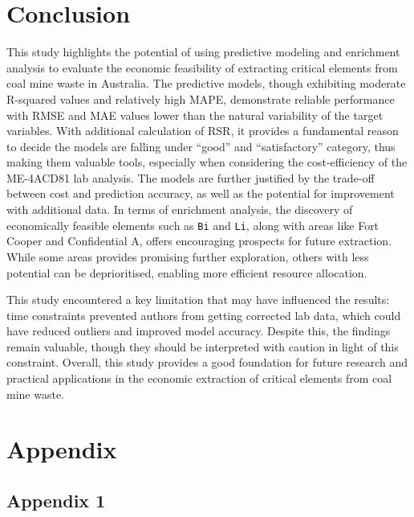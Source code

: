 \documentclass[11pt,a4paper,]{article}
\begin{document}
\section{Conclusion}\label{conclusion}

This study highlights the potential of using predictive modeling and enrichment analysis to evaluate the economic feasibility of extracting critical elements from coal mine waste in Australia. The predictive models, though exhibiting moderate R-squared values and relatively high MAPE, demonstrate reliable performance with RMSE and MAE values lower than the natural variability of the target variables. With additional calculation of RSR, it provides a fundamental reason to decide the models are falling under ``good'' and ``satisfactory'' category, thus making them valuable tools, especially when considering the cost-efficiency of the ME-4ACD81 lab analysis. The models are further justified by the trade-off between cost and prediction accuracy, as well as the potential for improvement with additional data. In terms of enrichment analysis, the discovery of economically feasible elements such as \texttt{Bi} and \texttt{Li}, along with areas like Fort Cooper and Confidential A, offers encouraging prospects for future extraction. While some areas provides promising further exploration, others with less potential can be deprioritised, enabling more efficient resource allocation.

This study encountered a key limitation that may have influenced the results: time constraints prevented authors from getting corrected lab data, which could have reduced outliers and improved model accuracy. Despite this, the findings remain valuable, though they should be interpreted with caution in light of this constraint. Overall, this study provides a good foundation for future research and practical applications in the economic extraction of critical elements from coal mine waste.

\newpage

\section{Appendix}\label{appendix}

\subsection{Appendix 1}\label{appendix-one}

\begingroup\fontsize{9}{11}\selectfont
\end{document}

